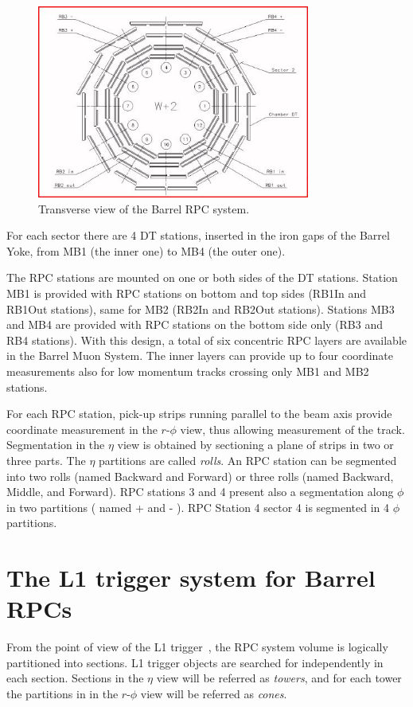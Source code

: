 \begin{figure}[hbtp]
  \begin{center}
    \includegraphics[width=0.8\textwidth]{barrel_layout}
    \hspace{1cm}
    \caption{Transverse view of the Barrel RPC system.}
    \label{fig:barrel_lay}
  \end{center}
\end{figure}

For each sector there are 4 DT stations, inserted in the 
iron gaps of the Barrel Yoke, from MB1 (the inner one)
to MB4 (the outer one). 

The RPC stations are mounted on one or both sides of the DT 
stations. Station MB1 is provided with RPC stations on 
bottom and top sides (RB1In and RB1Out stations), same 
for MB2 (RB2In and RB2Out stations). Stations MB3 and MB4
are provided with RPC stations on the bottom side only
(RB3 and RB4 stations). 
With this design, a total of six concentric RPC layers are 
available in the Barrel Muon System. The inner
layers can provide up to four coordinate measurements also for 
low momentum tracks crossing only MB1 and MB2 stations.

For each RPC station, pick-up strips running parallel to the 
beam axis provide coordinate measurement in the $r$-$\phi$ view,
thus allowing \pt measurement of the track. 
Segmentation in the $\eta$ view is obtained by sectioning
a plane of strips in two or three parts. 
The $\eta$ partitions are called {\em rolls}.
An RPC station can be segmented into two rolls (named Backward and 
Forward) or three rolls (named Backward, Middle, and Forward).
RPC stations 3 and 4 present also a segmentation along $\phi$ in two 
partitions ( named + and - ). RPC Station 4 sector 4 is segmented in 4 $\phi$ partitions.

\section{The L1 trigger system for Barrel RPCs}
From the point of view of the L1 trigger~\cite{ref:trig_tdr}, 
the RPC system volume is logically partitioned into 
sections. L1 trigger objects are searched 
for independently in each section.
Sections in the $\eta$ view will be referred as {\em towers},
and for each tower the partitions in  
in the $r$-$\phi$ view will be referred as {\em cones}.


